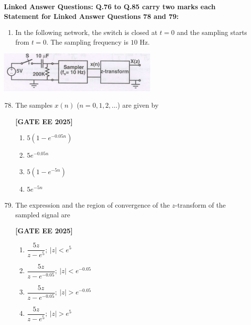 \documentclass[12pt]{article}
\begin{document}
\vspace{1em}
 \large \textbf {Linked Answer Questions: Q.76 to Q.85 carry two marks each}
 \large \textbf {Statement for Linked Answer Questions 78 and 79: }
\vspace{1em}
 \begin{enumerate}
\item In the following network, the switch is closed at $t=0$ and the sampling starts from $t=0$. The sampling frequency is $10$ Hz.
\end{enumerate}
\begin{center}
\includegraphics[width=0.6\textwidth]{figs/q7879.png}
\end{center}

\begin{enumerate}[leftmargin=*, label=\textbf{Q.\arabic*:}]
\setcounter{enumi}{77}

\item The samples $x(n)$ ($n=0,1,2,\ldots$) are given by
 
\noindent \textbf{[GATE EE 2025]}
\begin{enumerate}[label=(\Alph*)]
  \item $5 \left( 1 - e^{-0.05 n} \right)$
  \item $5 e^{-0.05 n}$
  \item $5 \left( 1 - e^{-5 n} \right)$
  \item $5 e^{-5 n}$
\end{enumerate}

\item The expression and the region of convergence of the $z$-transform of the sampled signal are
 
\noindent \textbf{[GATE EE 2025]}
\begin{enumerate}[label=(\Alph*)]
  \item $\dfrac{5z}{z-e^{5}};~ |z|<e^{5}$
  \item $\dfrac{5z}{z-e^{-0.05}};~ |z|<e^{-0.05}$
  \item $\dfrac{5z}{z-e^{-0.05}};~ |z|>e^{-0.05}$
  \item $\dfrac{5z}{z-e^{5}};~ |z|>e^{5}$
\end{enumerate}

\end{enumerate}
\end{document}
